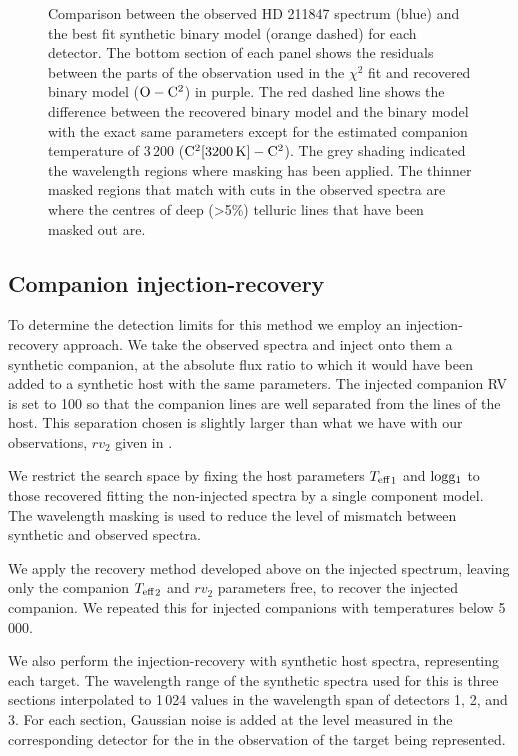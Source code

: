 \begin{figure*}
    \centering
    \caption{Comparison between the observed {HD 211847} spectrum (blue) and the best fit synthetic binary model (orange dashed) for each detector. The bottom section of each panel shows the residuals between the parts of the observation used in the \(\chi^2\) fit and recovered binary model (\(\rm O-C^2\)) in purple. The red dashed line shows the difference between the recovered binary model and the binary model with the exact same parameters except for the estimated companion temperature of 3\,200\K{} (\(\rm C^2[3200\,\si{\kelvin}{}]- C^2\)). The grey shading indicated the wavelength regions where masking has been applied. The thinner masked regions that match with cuts in the observed spectra are where the centres of deep (>5\%) telluric lines that have been masked out are.}
    \label{fig:visualinspection-hd2118471}
\end{figure*}


\subsection{Companion injection-recovery}
\label{subsection:injection-recovery}
To determine the detection limits for this method we employ an injection-recovery approach. We take the observed spectra and inject onto them a synthetic companion, at the absolute flux ratio to which it would have been added to a synthetic host with the same parameters. The injected companion {RV} is set to 100\kmps{} so that the companion lines are well separated from the lines of the host. This separation chosen is slightly larger than what we have with our observations, \(rv_2\) given in .

We restrict the search space by fixing the host parameters \({T_{\mathrm{eff}}}_{1}\) and \(\rm logg_1\) to those recovered fitting the non-injected spectra by a single component model. The wavelength masking is used to reduce the level of mismatch between synthetic and observed spectra.

We apply the recovery method developed above on the injected spectrum, leaving only the companion \({T_{\mathrm{eff}}}_{2}\) and \({rv}_2\) parameters free, to recover the injected companion. We repeated this for injected companions with temperatures below 5\,000\K{}.

We also perform the injection-recovery with synthetic host spectra, representing each target. The wavelength range of the synthetic spectra used for this is three sections interpolated to 1\,024 values in the wavelength span of detectors 1, 2, and 3. For each section, Gaussian noise is added at the level measured in the corresponding detector for the in the observation of the target being represented.


